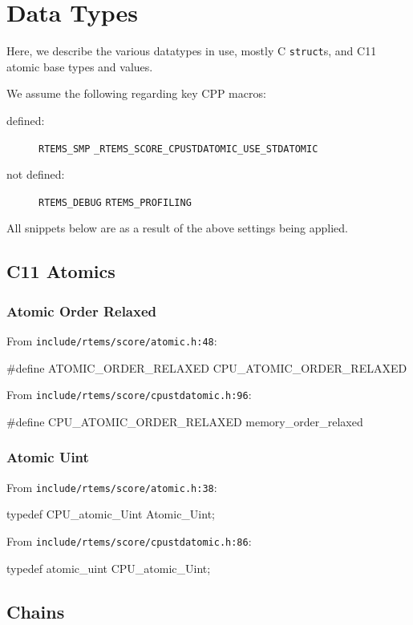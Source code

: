 \section{Data Types}\label{sec:datatypes}

Here, we describe the various datatypes in use,
mostly C \texttt{struct}s, and C11 atomic base types and values.

We assume the following regarding key CPP macros:
\begin{description}
  \item [defined:]
    \verb"RTEMS_SMP"
    \verb"_RTEMS_SCORE_CPUSTDATOMIC_USE_STDATOMIC"
  \item [not defined:]
    \verb"RTEMS_DEBUG"
    \verb"RTEMS_PROFILING"
    \verb""
\end{description}
All snippets below are as a result of the above settings being applied.

\subsection{C11 Atomics}

\subsubsection{Atomic Order Relaxed}

From \texttt{include/rtems/score/atomic.h:48}:
\begin{nicec}
#define ATOMIC_ORDER_RELAXED CPU_ATOMIC_ORDER_RELAXED
\end{nicec}
From \texttt{include/rtems/score/cpustdatomic.h:96}:
\begin{nicec}
#define CPU_ATOMIC_ORDER_RELAXED memory_order_relaxed
\end{nicec}

\subsubsection{Atomic Uint}

From \texttt{include/rtems/score/atomic.h:38}:
\begin{nicec}
typedef CPU_atomic_Uint Atomic_Uint;
\end{nicec}
From \texttt{include/rtems/score/cpustdatomic.h:86}:
\begin{nicec}
typedef atomic_uint CPU_atomic_Uint;
\end{nicec}

\newpage
\subsection{Chains}

